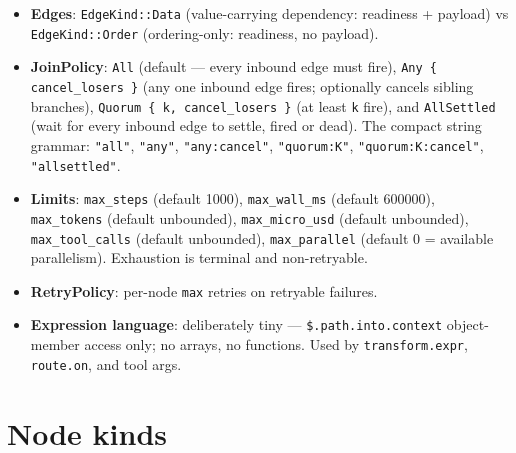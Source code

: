 \documentclass[
	fontsize=10pt,
	twoside=false,
	secnumdepth=2,
	open=any,
]{kaobook}
\begin{document}
\begin{itemize}
    \item \textbf{Edges}: \texttt{EdgeKind::Data} (value-carrying
        dependency: readiness + payload) vs \texttt{EdgeKind::Order}
        (ordering-only: readiness, no payload).
    \item \textbf{JoinPolicy}: \texttt{All} (default — every inbound edge
        must fire), \texttt{Any \{ cancel\_losers \}} (any one inbound edge
        fires; optionally cancels sibling branches), \texttt{Quorum \{ k,
        cancel\_losers \}} (at least \texttt{k} fire), and
        \texttt{AllSettled} (wait for every inbound edge to settle, fired
        or dead). The compact string grammar: \texttt{"all"},
        \texttt{"any"}, \texttt{"any:cancel"}, \texttt{"quorum:K"},
        \texttt{"quorum:K:cancel"}, \texttt{"allsettled"}.
    \item \textbf{Limits}: \texttt{max\_steps} (default 1000),
        \texttt{max\_wall\_ms} (default 600000),
        \texttt{max\_tokens} (default unbounded),
        \texttt{max\_micro\_usd} (default unbounded),
        \texttt{max\_tool\_calls} (default unbounded),
        \texttt{max\_parallel} (default 0 = available parallelism).
        Exhaustion is terminal and non-retryable.
    \item \textbf{RetryPolicy}: per-node \texttt{max} retries on
        retryable failures.
    \item \textbf{Expression language}: deliberately tiny —
        \texttt{\$.path.into.context} object-member access only; no
        arrays, no functions. Used by \texttt{transform.expr},
        \texttt{route.on}, and tool args.
\end{itemize}

\section{Node kinds}
\end{document}
